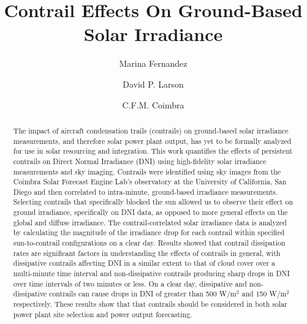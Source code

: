 \documentclass[10pt]{llncs}
\title{Contrail Effects On Ground-Based Solar Irradiance}
\author{
    Marina Fernandez 
    \and 
    David P. Larson 
    \and 
    C.F.M. Coimbra
}
\institute{
    \textit{Mechanical and Aerospace Engineering, University of California, San Diego}
}
\begin{document}
\maketitle

\begin{abstract}
The impact of aircraft condensation trails (contrails) on ground-based solar irradiance measurements, and therefore solar power plant output, has yet to be formally analyzed for use in solar resourcing and integration. This work quantifies the effects of persistent contrails on Direct Normal Irradiance (DNI) using high-fidelity solar irradiance measurements and sky imaging. Contrails were identified using sky images from the Coimbra Solar Forecast Engine Lab's observatory at the University of California, San Diego and then correlated to intra-minute, ground-based irradiance measurements. Selecting contrails that specifically blocked the sun allowed us to observe their effect on ground irradiance, specifically on DNI data, as opposed to more general effects on the global and diffuse irradiance. The contrail-correlated solar irradiance data is analyzed by calculating the magnitude of the irradiance drop for each contrail within specified sun-to-contrail configurations on a clear day. Results showed that contrail dissipation rates are significant factors in understanding the effects of contrails in general, with dissipative contrails affecting DNI in a similar extent to that of cloud cover over a multi-minute time interval and non-dissipative contrails producing sharp drops in DNI over time intervals of two minutes or less. On a clear day, dissipative and non-dissipative contrails can cause drops in DNI of greater than 500 W/m$^2$ and 150 W/m$^2$ respectively. These results show that that contrails should be considered in both solar power plant site selection and power output forecasting.
\end{abstract}
\end{document}
